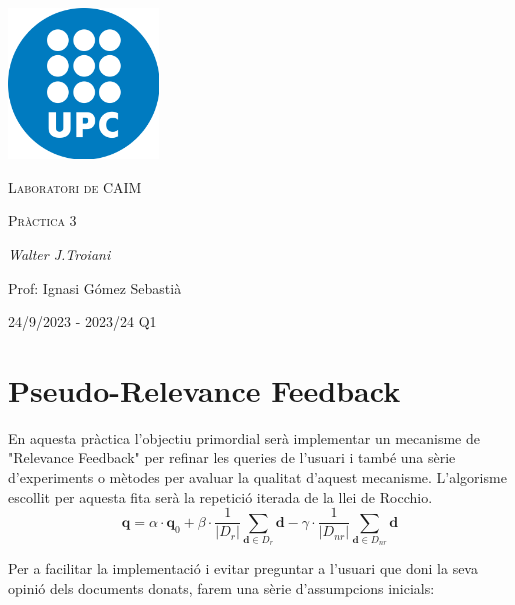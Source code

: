 \documentclass[12pt]{article}
\begin{document}
\begin{titlepage}
	\centering
	\includegraphics[width=0.3\textwidth]{university.png}\par\vspace{1cm}
	{\scshape\LARGE Laboratori de CAIM \par}
	\vspace{1cm}
	{\scshape\Large Pràctica 3\par}
	\vspace{1.5cm}
	{\Large\itshape Walter J.Troiani\par}
	\vfill
	Prof: Ignasi Gómez Sebastià\par
    \vspace{1cm}
    24/9/2023 - 2023/24 Q1\par
	\vspace{1cm}

\end{titlepage}

\newpage

\section{Pseudo-Relevance Feedback}

En aquesta pràctica l'objectiu primordial serà implementar un mecanisme de "Relevance Feedback" per refinar les queries de l'usuari i també una sèrie d'experiments o mètodes per avaluar la qualitat d'aquest mecanisme. L'algorisme escollit per aquesta fita serà la repetició iterada de la llei de Rocchio.
\\ 

\begin{equation}
\mathbf{q} = \alpha \cdot \mathbf{q}_{0} + \beta \cdot \frac{1}{|D_{r}|} \sum_{\mathbf{d} \in D_{r}} \mathbf{d} - \gamma \cdot \frac{1}{|D_{nr}|} \sum_{\mathbf{d} \in D_{nr}} \mathbf{d}
\end{equation}

Per a facilitar la implementació i evitar preguntar a l'usuari que doni la seva opinió dels documents donats, farem una sèrie d'assumpcions inicials:
\\
\end{document}
